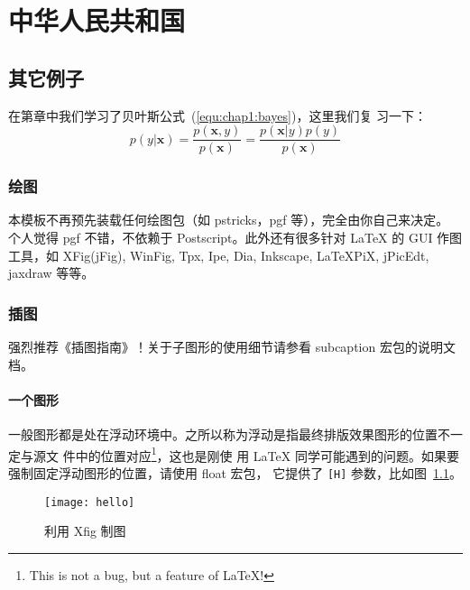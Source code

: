 

\chapter{中华人民共和国}
\label{cha:china}

\section{其它例子}
\label{sec:other}

在第章中我们学习了贝叶斯公式~(\ref{equ:chap1:bayes})，这里我们复
习一下：
\begin{equation}
\label{equ:chap2:bayes}
p(y|\mathbf{x}) = \frac{p(\mathbf{x},y)}{p(\mathbf{x})}=
\frac{p(\mathbf{x}|y)p(y)}{p(\mathbf{x})} 
\end{equation}

\subsection{绘图}
\label{sec:draw}

本模板不再预先装载任何绘图包（如 \textsf{pstricks，pgf} 等），完全由你自己来决定。
个人觉得 \textsf{pgf} 不错，不依赖于 Postscript。此外还有很多针对 \LaTeX{} 的
 GUI 作图工具，如 XFig(jFig), WinFig, Tpx, Ipe, Dia, Inkscape, LaTeXPiX,
jPicEdt, jaxdraw 等等。

\subsection{插图}
\label{sec:graphs}

强烈推荐《\LaTeXe 插图指南》！关于子图形的使用细节请参看 \textsf{subcaption} 宏包的说明文档。

\subsubsection{一个图形}
\label{sec:onefig}
一般图形都是处在浮动环境中。之所以称为浮动是指最终排版效果图形的位置不一定与源文
件中的位置对应\footnote{This is not a bug, but a feature of \LaTeX!}，这也是刚使
用 \LaTeX{} 同学可能遇到的问题。如果要强制固定浮动图形的位置，请使用 \textsf{float} 宏包，
它提供了 \texttt{[H]} 参数，比如图~\ref{fig:xfig1}。
\begin{figure}[H] %
  \centering
  \texttt{[image: hello]}
  \caption{利用 Xfig 制图}
  \label{fig:xfig1}
\end{figure}


